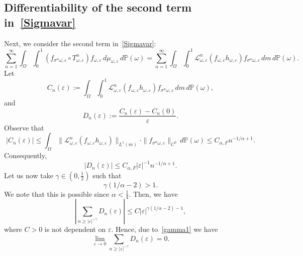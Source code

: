 \documentclass[12pt,reqno,a4paper]{article}
\begin{document}
\subsection{Differentiability of the second term in~\eqref{Sigmavar}}
Next, we consider the second term in~\eqref{Sigmavar}:
\[
\sum_{n=1}^\infty \int_\Omega \int_0^1 (f_{\sigma^n \omega, \varepsilon}\circ T_{\omega, \varepsilon}^n)f_{\omega, \varepsilon}\, d\mu_{\omega, \varepsilon}\, d\mathbb P(\omega)=\sum_{n=1}^\infty \int_\Omega \int_0^1 \mathcal L_{\omega, \varepsilon}^n (f_{\omega, \varepsilon}h_{\omega, \varepsilon})f_{\sigma^n \omega, \varepsilon}\, dm\, d\mathbb P(\omega).
\]
Let 
\[
C_n(\varepsilon):=\int_\Omega \int_0^1 \mathcal L_{\omega, \varepsilon}^n (f_{\omega, \varepsilon}h_{\omega, \varepsilon})f_{\sigma^n \omega, \varepsilon}\, dm\, d\mathbb P(\omega),
\]
and
\[
D_n(\varepsilon):=\frac{C_n(\varepsilon)-C_n(0)}{\varepsilon}.
\]
Observe that 
\[
|C_n(\varepsilon)| \le \int_\Omega \|\mathcal L_{\omega, \varepsilon}^n(f_{\omega, \varepsilon}h_{\omega, \varepsilon} )\|_{L^1(m)} \cdot \|f_{\sigma^n \omega, \varepsilon}\|_{C^0}\, d\mathbb P(\omega) \le C_{\alpha, F} n^{-1/\alpha+1}.
\]
Consequently, 
\[
|D_n(\varepsilon)| \le C_{\alpha, F} |\varepsilon|^{-1}n^{-1/\alpha+1}.
\]
Let us now take $\gamma \in (0, \frac 1 2)$ such that 
\begin{equation}\label{gamma1}
	\gamma (1/\alpha-2)>1.
\end{equation}
We note that this is possible since $\alpha <\frac 1 4$.
Then, we have
\[
\left |\sum_{n\ge |\varepsilon|^{-\gamma}}D_n(\varepsilon)\right |\le C|\varepsilon|^{\gamma (1/\alpha-2)-1},
\]
where $C>0$ is not dependent on $\varepsilon$.
Hence, due to~\eqref{gamma1} we have
\begin{equation}\label{w00}
	\lim_{\varepsilon \to 0}\sum_{n\ge |\varepsilon|^{-\gamma}}D_n(\varepsilon)=0.
\end{equation}
\end{document}
